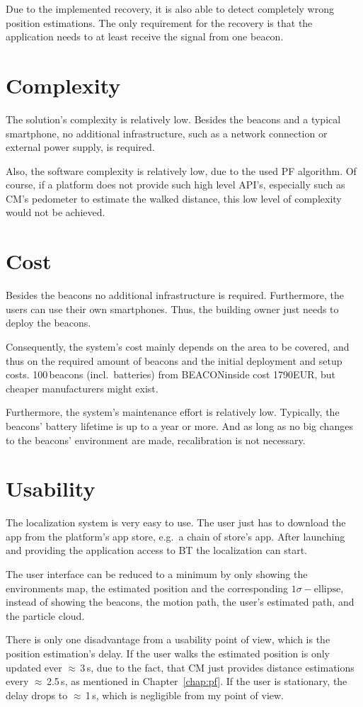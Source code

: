 Due to the implemented recovery, it is also able to detect completely wrong position estimations. The only requirement for the recovery is that the application needs to at least receive the signal from one beacon.

\section{Complexity}
The solution's complexity is relatively low. Besides the beacons and a typical smartphone, no additional infrastructure, such as a network connection or external power supply, is required.
	
Also, the software complexity is relatively low, due to the used \ac{PF} algorithm. Of course, if a platform does not provide such high level \acs{API}'s, especially such as \acl{CM}'s pedometer to estimate the walked distance, this low level of complexity would not be achieved.

\section{Cost}
Besides the beacons no additional infrastructure is required. Furthermore, the users can use their own smartphones. Thus, the building owner just needs to deploy the beacons.

Consequently, the system's cost mainly depends on the area to be covered, and thus on the required amount of beacons and the initial deployment and setup costs. 100\,beacons (incl.\ batteries) from BEACONinside cost 1790EUR, but cheaper manufacturers might exist.

Furthermore, the system's maintenance effort is relatively low. Typically, the beacons' battery lifetime is up to a year or more. And as long as no big changes to the beacons' environment are made, recalibration is not necessary.

\section{Usability}
The localization system is very easy to use. The user just has to download the app from the platform's app store, e.g.\ a chain of store's app. After launching and providing the application access to \acl{BT} the localization can start.

The user interface can be reduced to a minimum by only showing the environments map, the estimated position and the corresponding $1\sigma-\text{ellipse}$, instead of showing the beacons, the motion path, the user's estimated path, and the particle cloud.

There is only one disadvantage from a usability point of view, which is the position estimation's delay. If the user walks the estimated position is only updated ever $\approx$\,3\,s, due to the fact, that \acs{CM} just provides distance estimations every $\approx$\,2.5\,s, as mentioned in Chapter~\ref{chap:pf}. If the user is stationary, the delay drops to $\approx$\,1\,s, which is negligible from my point of view.
